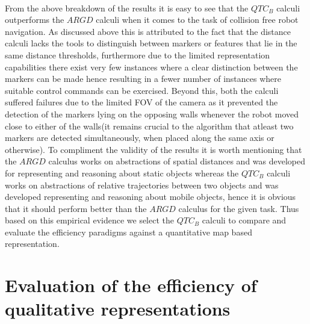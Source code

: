 \paragraph{} From the above breakdown of the results it is easy to see that the $QTC_B$ calculi outperforms the $ARGD$ calculi when it comes to the task of collision free robot navigation. As discussed above this is attributed to the fact that the distance calculi lacks the tools to distinguish between markers or features that lie in the same distance thresholds, furthermore due to the limited representation capabilities there exist very few instances where a clear distinction between the markers can be made hence resulting in a fewer number of instances where suitable control commands can be exercised. Beyond this, both the calculi suffered failures due to the limited FOV of the camera as it prevented the detection of the markers lying on the opposing walls whenever the robot moved close to either of the walls(it remains crucial to the algorithm that atleast two markers are detected simultaneously, when placed along the same axis or otherwise). To compliment the validity of the results it is worth mentioning that the $ARGD$ calculus works on abstractions of spatial distances and was developed for representing and reasoning about static objects whereas the $QTC_B$ calculi works on abstractions of relative trajectories between two objects and was developed representing and reasoning about mobile objects, hence it is obvious that it should perform better than the $ARGD$ calculus for the given task. Thus based on this empirical evidence we select the $QTC_B$ calculi to compare and evaluate the efficiency paradigms against a quantitative map based representation.


\section{Evaluation of the efficiency of qualitative representations}

